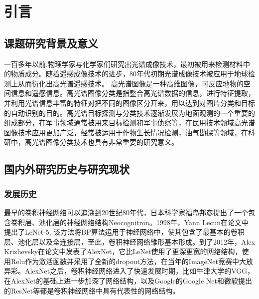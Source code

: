 \section{引言}

\subsection{课题研究背景及意义}

一百多年以前,物理学家与化学家们研究出光谱成像技术，最初被用来检测材料中的物质成分。随着遥感成像技术的进步，80年代初期光谱成像技术被应用于地球检测上从而衍化出高光谱遥感技术\cite{ref9}。 高光谱图像是一种高维图像，可反应地物的空间信息和遥感信息。高光谱图像分类是指整合高光谱数据的信息，进行特征提取，并利用光谱信息丰富的特征对把不同的图像区分开来，用以达到对图片分类和目标的自动识别的目的。高光谱目标探测与分类技术逐渐发展为地面观测的一个重要的组成部分，在军事领域通常被用来目标检测和军事侦察等，在民用技术领域高光谱图像技术应用更加广泛，经常被运用于作物生长情况检测，油气勘探等领域，在科研中，高光谱图像分类技术也具有非常重要的研究意义。

\subsection{国内外研究历史与研究现状}

\subsubsection{发展历史}

最早的卷积神经网络可以追溯到20世纪80年代，日本科学家福岛邦彦提出了一个包含卷积层、池化层的神经网络结构Neocognitron\cite{ref1}。1998年，Yann Lecun在论文中提出了LeNet-5\cite{ref2}, 该方法将BP算法运用于神经网络中，使其包含了最基本的卷积层、池化层以及全连接层，至此，卷积神经网络雏形基本形成。到了2012年，Alex Krizhevsky在论文中发表了AlexNet\cite{ref3}，它比LeNet使用了更深更宽的网络结构，使用Relu作为激活函数并采用了全新的dropout方法，在当年的ImageNet竞赛中大放异彩。AlexNet之后，卷积神经网络进入了快速发展时期，比如牛津大学的VGG\cite{ref4}，在AlexNet的基础上进一步加深了网络结构，以及Google的Google Net\cite{ref5}和微软提出的ResNet\cite{ref6}等都是卷积神经网络中具有代表性的网络结构。
